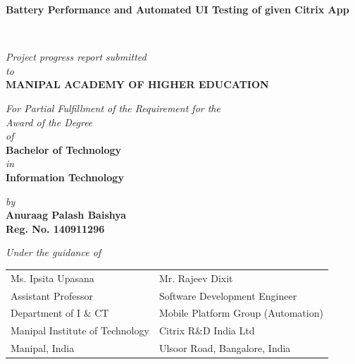 \documentclass[a4paper,12pt]{report}
\begin{document}
\begin{titlepage}
\vspace*{2cm}
	\begin{center}
	\large{\textbf{Battery Performance and Automated UI Testing of given Citrix App}}
	\end{center}
	\vspace{0.5cm}\
	\begin{center}
	\small{\textit{Project progress report submitted} \\ \vspace{0.25cm} \textit{to} \\ \vspace{0.25cm}\textbf{MANIPAL ACADEMY OF HIGHER EDUCATION} \\}
	\end{center}
	\vspace{0.25cm}
	\begin{center}
	\small{\textit{For Partial Fulfillment of the Requirement for the\\ \vspace{0.25cm}Award of the Degree\\ \vspace{0.25cm}of}} \\ \vspace{0.25cm}
	\textbf{Bachelor of Technology} \\  \vspace{0.25cm} \textit{in} \\ \textbf{Information Technology}
	\end{center}
	
	\begin{center}
	\small{\textit{by}} \\
	\textbf{Anuraag Palash Baishya} \\ \textbf{Reg. No. 140911296} \\
	\end{center}


\begin{center}
	\small{\textit{Under the guidance of}} \\
\renewcommand{\baselinestretch}{1}
{	
\begin{table}[h]
	\centering
		\begin{tabular}{p{3in} p{3in}}
			Ms. Ipsita Upasana &  Mr. Rajeev Dixit  \\
			Assistant Professor
 &    Software Development Engineer\\
			Department of I \& CT  &  Mobile Platform Group (Automation) \\
			 Manipal Institute of Technology& Citrix R\&D India Ltd \\
			Manipal, India &  Ulsoor Road, Bangalore, India 
		\end{tabular}
\end{table}
}


\end{center}
\end{titlepage}
\end{document}
